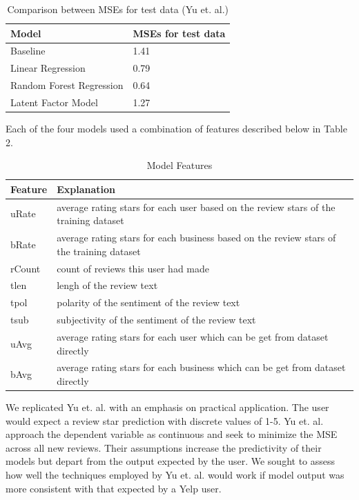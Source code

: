 \documentclass[12pt]{article}
\begin{document}
\begin{table}[h]
  \caption{\label{tab:rep-models}Comparison between MSEs for test data (Yu et. al.)}
  \centering
  \begin{tabular}{|l|l|}
    \hline
    \textbf{Model} & \textbf{MSEs for test data} \\
    \hline
    Baseline & 1.41 \\
    \hline
    Linear Regression & 0.79 \\
    \hline
    Random Forest Regression & 0.64 \\
    \hline
    Latent Factor Model & 1.27 \\
    \hline
  \end{tabular}
\end{table}

Each of the four models used a combination of features described below in Table 2.

\begin{table}[h]
  \caption{\label{tab:features}Model Features}
  \centering
\begin{tabular}{| l | l |}
  \hline
  \textbf{Feature} & \textbf{Explanation} \\
  \hline
  uRate & average rating stars for each user based on the review stars of the
          training dataset \\
  \hline
  bRate & average rating stars for each business based on the review stars of the training 
          dataset \\
  \hline
  rCount & count of reviews this user had made \\
  \hline
  tlen & lengh of the review text \\
  \hline
  tpol & polarity of the sentiment of the review text \\
  \hline
  tsub & subjectivity of the sentiment of the review text \\
  \hline
  uAvg & average rating stars for each user which can be get from dataset directly \\
  \hline
  bAvg & average rating stars for each business which can be get from dataset directly \\
  \hline
\end{tabular}
\end{table}

We replicated Yu et. al. \cite{yu2015restaurants} with an emphasis on practical application. The
user would expect a review star prediction with discrete values of 1-5. Yu et. al.
\cite{yu2015restaurants} approach the dependent variable as continuous and seek to minimize
the MSE across all new reviews. Their assumptions increase the predictivity of their models but
depart from the output expected by the user. We sought to assess how well the techniques employed
by Yu et. al. would work if model output was more consistent with that expected by a Yelp user.
\end{document}
